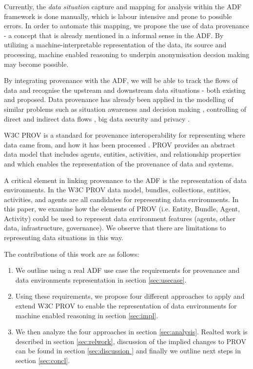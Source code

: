 Currently, the \textit{data situation} capture and mapping for analysis within the ADF framework is done manually, which is labour intensive and prone to possible errors. In order to automate this mapping, we propose the use of data provenance - a concept that is already mentioned in a informal sense in the ADF. By utilizing a machine-interpretable representation of the data, its source and processing, machine enabled reasoning to underpin anonymisation decsion making may become possible. 

By integrating provenance with the ADF, we will be able to track the flows of data and  recognise the upstream and downstream  data situations - both existing and proposed. Data provenance has already been applied in the modelling of similar problems such as  situation awareness and decision making \cite{baclawski2017framework}, controlling of direct and indirect data flows \cite{rong2020provenance}, big data security and privacy \cite{gao2020big}. 

W3C PROV is a standard for provenance interoperability for representing where data came from, and how it has been processed \cite{PROV-DM15,missier2013w3c}. PROV provides an abstract data model that includes agents, entities, activities, and relationship properties and which enables the representation of the  provenance of data and systems.

A critical element in linking provenance to the ADF is the representation of data environments. In the W3C PROV data model, bundles, collections, entities, activities, and agents are all candidates for representing data environments. In this paper, we examine how the elements of PROV (i.e. Entity, Bundle, Agent, Activity) could be used to represent data environment features (agents, other data, infrastructure,  governance). We observe that there are limitations to representing data situations in this way. 

The contributions of this work are as follows:
\begin{enumerate}
    \item We outline using a real ADF use case the requirements for provenance and data environments representation in section \ref{sec:usecase}.
    \item Using these requirements, we propose four different approaches to apply and extend W3C PROV to enable the representation of data environments for machine enabled reasoning in section \ref{sec:impl}.
    \item We then analyze the four approaches in section \ref{sec:analysis}. Realted work is described in section \ref{sec:relwork}, discussion of the implied changes to PROV can be found in section \ref{sec:discussion }
      and finally we outline next steps in section \ref{sec:concl}.
\end{enumerate}

